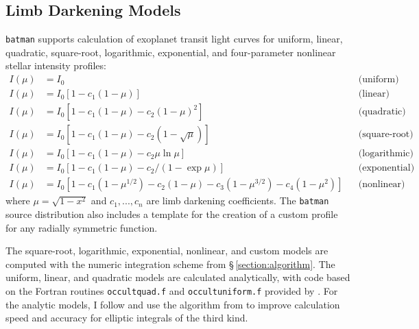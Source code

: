 \documentclass[12pt,preprint]{aastex}
\begin{document}
\subsection{Limb Darkening Models}
\texttt{batman} supports calculation of exoplanet transit light curves for uniform, linear, quadratic, square-root, logarithmic, exponential, and four-parameter nonlinear stellar intensity profiles:
\begin{align}
  I(\mu) &= I_0                                                                         & &\text{(uniform)}             \\
  I(\mu) &= I_0[1 - c_1(1-\mu)]                                                         & &\text{(linear)}              \\
  I(\mu) &= I_0[1 - c_1(1 - \mu) - c_2(1-\mu)^2]                                        & &\text{(quadratic)}           \\
  I(\mu) &= I_0[1 - c_1(1 - \mu) - c_2(1-\sqrt{\mu})]                                   & &\text{(square-root)}         \\
  I(\mu) &= I_0[1 - c_1(1 - \mu) - c_2\mu\ln{\mu}]                                      & &\text{(logarithmic)}         \\
  I(\mu) &= I_0\left[1 - c_1(1 - \mu) - c_2/(1-\exp{\mu})\right]                  	& &\text{(exponential)}         \\
  I(\mu) &= I_0[1 - c_1(1-\mu^{1/2}) - c_2(1- \mu) - c_3(1-\mu^{3/2}) - c_4(1-\mu^2)]   & &\text{(nonlinear)}
\end{align}
where $\mu = \sqrt{1-x^2}$ and $c_1, ..., c_n$ are limb darkening coefficients.  The \texttt{batman} source distribution also includes a template for the creation of a custom profile for any radially symmetric function.  

The square-root, logarithmic, exponential, nonlinear, and custom models are computed with the numeric integration scheme from \S\,\ref{section:algorithm}.  The uniform, linear, and quadratic models are calculated analytically, with code based on the Fortran routines \texttt{occultquad.f} and \texttt{occultuniform.f} provided by \cite{mandel02}. For the analytic models, I follow \cite{eastman13} and use the algorithm from \cite{bulirsch65} to improve calculation speed and accuracy for elliptic integrals of the third kind.
\end{document}
